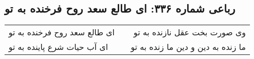 \begin{center}
\section*{رباعی شماره ۳۳۶: ای طالع سعد روح فرخنده به تو}
\label{sec:sh336}
\begin{longtable}{l p{0.5cm} r}
ای طالع سعد روح فرخنده به تو
&&
وی صورت بخت عقل نازنده به تو
\\
ای آب حیات شرع پاینده به تو
&&
ما زنده به دین و دین ما زنده به تو
\\
\end{longtable}
\end{center}
